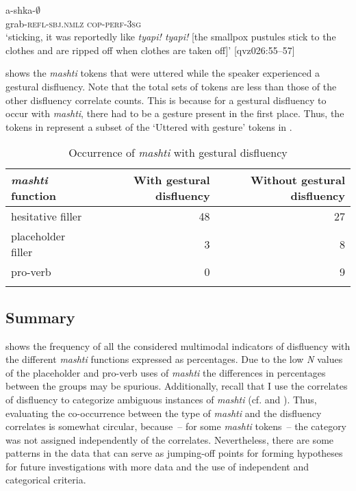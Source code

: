\documentclass[output=paper]{langscibook}
\begin{document}
 {a-shka-${\emptyset}$}\\
{grab-\textsc{refl-sbj.nmlz}} {\textsc{cop-perf-3sg}}\\
\glt ‘sticking, it was reportedly like \textit{tyapi! tyapi!} [the smallpox pustules stick to the clothes and are ripped off when clothes are taken off]’ [qvz026:55--57]
\z\z

 shows the \textit{mashti} tokens that were uttered while the speaker experienced a gestural disfluency. Note that the total sets of tokens are less than those of the other disfluency correlate counts. This is because for a gestural disfluency to occur with \textit{mashti}, there had to be a gesture present in the first place. Thus, the tokens in  represent a subset of the ‘Uttered with gesture’ tokens in . 



\begin{table}
\begin{tabular}{lrr}
\lsptoprule
\textit{mashti} function & With gestural disfluency & Without gestural disfluency\\
\midrule
hesitative filler & 48 & 27\\
placeholder filler & 3 & 8\\
pro-verb & 0 & 9\\
\lspbottomrule
\end{tabular}
\caption{\label{tab:rice:14}Occurrence of \textit{mashti} with gestural disfluency}
\end{table}

\subsection{Summary}
\label{sec:rice:4.3}
 shows the frequency of all the considered multimodal indicators of disfluency with the different \textit{mashti} functions expressed as percentages. Due to the low \textit{N} values of the placeholder and pro-verb uses of \textit{mashti} the differences in percentages between the groups may be spurious. Additionally, recall that I use the correlates of disfluency to categorize ambiguous instances of \textit{mashti} (cf.  and ). Thus, evaluating the co-occurrence between the type of \textit{mashti} and the disfluency correlates is somewhat circular, because~-- for some \textit{mashti} tokens~-- the category was not assigned independently of the correlates. Nevertheless, there are some patterns in the data that can serve as jumping-off points for forming hypotheses for future investigations with more data and the use of independent and categorical criteria.
\end{document}
